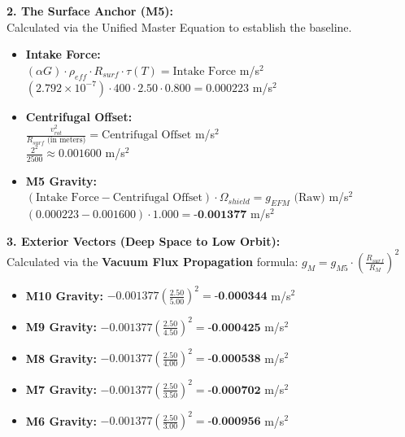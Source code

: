 \documentclass[11pt, a4paper]{article}
\begin{document}
  \vspace{1.0em}
  \noindent \textbf{2. The Surface Anchor (M5):} \\
  \hspace*{1em} Calculated via the Unified Master Equation to establish the baseline.
  \begin{itemize}
    \item \textbf{Intake Force:} \\[0.5em]
    \hspace*{2em} $(\alpha G) \cdot \rho_{eff} \cdot R_{surf} \cdot \tau(T) = \text{Intake Force}$ m/s$^2$ \\[1em]
    \hspace*{2em} $(2.792 \times 10^{-7}) \cdot 400 \cdot 2.50 \cdot 0.800 = 0.000223$ m/s$^2$
    
    \item \textbf{Centrifugal Offset:} \\[0.5em]
    \hspace*{2em} $\frac{v_{rot}^2}{R_{surf} \text{ (in meters)}} = \text{Centrifugal Offset}$ m/s$^2$ \\[1em]
    \hspace*{2em} $\frac{2^2}{2500} \approx 0.001600$ m/s$^2$
    
    \item \textbf{M5 Gravity:} \\[0.5em]
    \hspace*{2em} $(\text{Intake Force} - \text{Centrifugal Offset}) \cdot \Omega_{shield} = g_{EFM} \text{ (Raw)}$ m/s$^2$ \\[1em]
    \hspace*{2em} $(0.000223 - 0.001600) \cdot 1.000 = \textbf{-0.001377}$ m/s$^2$
  \end{itemize}

  \clearpage
  \noindent \textbf{3. Exterior Vectors (Deep Space to Low Orbit):} \\
  \hspace*{1em} Calculated via the \textbf{Vacuum Flux Propagation} formula: $g_M = g_{M5} \cdot \left( \frac{R_{surf}}{R_M} \right)^2$
  \begin{itemize}
    \item \textbf{M10 Gravity:} $-0.001377 \left( \frac{2.50}{5.00} \right)^2 = \textbf{-0.000344}$ m/s$^2$
    \item \textbf{M9 Gravity:} $-0.001377 \left( \frac{2.50}{4.50} \right)^2 = \textbf{-0.000425}$ m/s$^2$
    \item \textbf{M8 Gravity:} $-0.001377 \left( \frac{2.50}{4.00} \right)^2 = \textbf{-0.000538}$ m/s$^2$
    \item \textbf{M7 Gravity:} $-0.001377 \left( \frac{2.50}{3.50} \right)^2 = \textbf{-0.000702}$ m/s$^2$
    \item \textbf{M6 Gravity:} $-0.001377 \left( \frac{2.50}{3.00} \right)^2 = \textbf{-0.000956}$ m/s$^2$
  \end{itemize}
\end{document}
